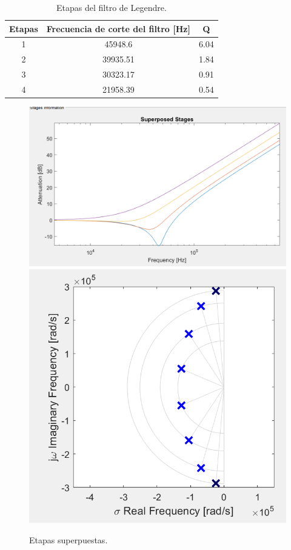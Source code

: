 \documentclass[../../ASSD_TP1_G7.tex]{subfiles}
\begin{document}
\begin{table}[H]
\begin{centering}
\begin{tabular}{|c|c|c|}
\hline 
Etapas & Frecuencia de corte del filtro {[}Hz{]} & Q\\
\hline 
\hline 
1 & 45948.6 & 6.04\\
\hline 
2 & 39935.51 & 1.84\\
\hline 
3 & 30323.17 & 0.91\\
\hline 
4 & 21958.39 & 0.54\\
\hline 
\end{tabular}\caption{Etapas del filtro de Legendre.\label{tab:Etapas-del-filtro}}
\par\end{centering}
\end{table}


\begin{figure}[H]
\begin{centering}
\includegraphics[scale=0.6]{Imagenes/etapas_superpuestas.PNG}\includegraphics[scale=0.7]{Imagenes/poles_constelation.PNG}\caption{Etapas superpuestas.}
\par\end{centering}
\end{figure}
\end{document}
